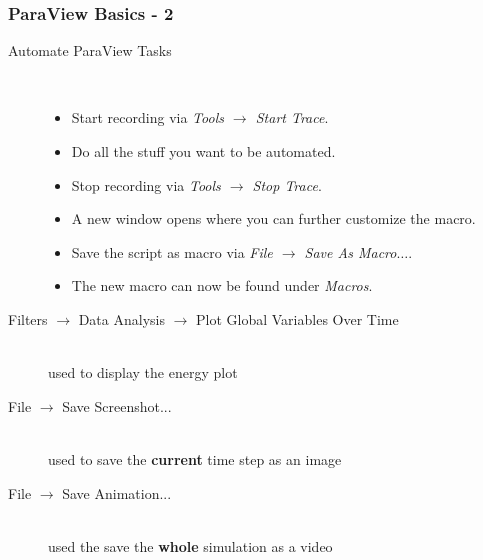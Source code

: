 \begin{frame}[fragile]
	\frametitle{ParaView Basics - 2}
	\setlength{\leftmargini}{-0.4cm}
    \setlength{\leftmarginii}{-0.4cm}
    \begin{description}
      \item[Automate ParaView Tasks] \hfill\\
        \begin{itemize}
            \item Start recording via \textit{Tools $\rightarrow$ Start Trace}.
            \item Do all the stuff you want to be automated.
            \item Stop recording via \textit{Tools $\rightarrow$ Stop Trace}.
            \item A new window opens where you can further customize the macro.
            \item Save the script as macro via \textit{File $\rightarrow$ Save As Macro$\dots$}.
            \item The new macro can now be found under \textit{Macros}.
        \end{itemize}
      \item[Filters $\rightarrow$ Data Analysis $\rightarrow$ Plot Global Variables Over Time] \hfill\\\hspace{-.5cm}
        used to display the energy plot
      \item[File $\rightarrow$ Save Screenshot...] \hfill\\\hspace{-.5cm}
        used to save the \textbf{current} time step as an image
      \item[File $\rightarrow$ Save Animation...] \hfill\\\hspace{-.5cm}
        used the save the \textbf{whole} simulation as a video
    \end{description}
\end{frame}

